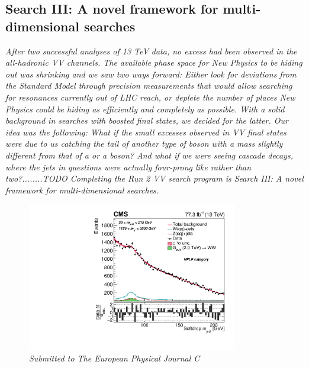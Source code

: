 \vspace*{\fill}
\begin{centering}
\section{Search III: A novel framework for multi-dimensional searches}
\label{searchIII}
\textit{
After two successful analyses of 13 TeV data, no excess had been observed in the all-hadronic VV channels. The available phase space for New Physics to be hiding out was shrinking and we saw two ways forward: Either look for deviations from the Standard Model through precision measurements that would allow searching for resonances currently out of LHC reach, or deplete the number of places New Physics could be hiding as efficiently and completely as possible.
With a solid background in searches with boosted final states, we decided for the latter. Our idea was the following: What if the small excesses observed in VV final states were due to us catching the tail of another type of boson with a mass slightly different from that of a \PW or a \PZ boson? And what if we were seeing cascade decays, where the jets in questions were actually four-prong like rather than two?........TODO
\newline
\newline
Completing the Run 2 VV search program is Search III: A novel framework for multi-dimensional searches.
}
\end{centering}
\begin{figure}[b!]
    \centering
    \includegraphics[height=6.5cm]{figures/analysis/search3/B2G-18-002/PostFitComboHPLP_Y-Proj__x___0_-1_z___0_-1.pdf}
    \vspace*{10mm}
    \caption*{\footnotesize{\textit{Submitted to The European Physical Journal C}}}
\end{figure}


\clearpage





